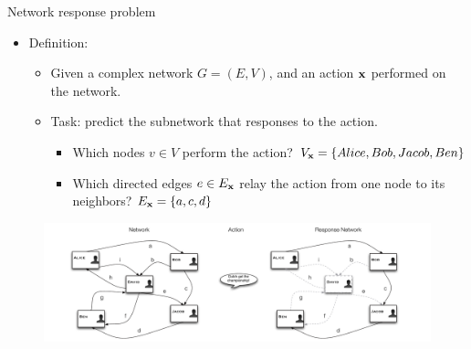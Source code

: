 \documentclass[first=dgreen,second=purple,logo=yellowexc]{aaltoslides}
\begin{document}
\begin{frame}{Network response problem}
	\begin{itemize}\footnotesize
		\item Definition:
		\begin{itemize}\footnotesize
			\item Given a complex network $G=(E,V)$, and an action $\mathbf {x}$ performed on the network.
			\item Task: predict the subnetwork that responses to the action.
			\begin{itemize}\footnotesize
				\item Which nodes $v\in V$ perform the action? $V_{\mathbf {x}}=\{Alice,Bob,Jacob,Ben\}$
				\item Which directed edges $e\in E_{\mathbf {x}}$ relay the action from one node to its neighbors? $E_{\mathbf {x}}=\{a,c,d\}$
			\end{itemize}
		\end{itemize}
	\end{itemize}
	\vspace{-10mm}
	\begin{figure}
		\center
		\includegraphics[scale=0.25]{./figures/problem_definition.pdf}
	\end{figure}
\end{frame}
\end{document}
